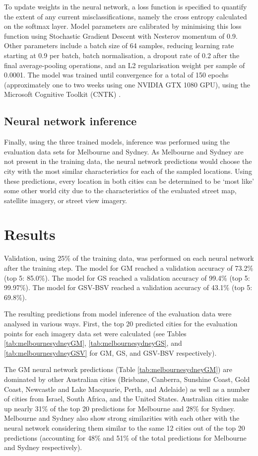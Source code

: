 \documentclass[10pt,letterpaper,hidelinks]{article}
\begin{document}
To update weights in the neural network, a loss function is specified to quantify the extent of any current misclassifications, namely the cross entropy calculated on the softmax layer. Model parameters are calibrated by minimising this loss function using Stochastic Gradient Descent with Nesterov momentum of 0.9. Other parameters include a batch size of 64 samples, reducing learning rate starting at 0.9 per batch, batch normalisation, a dropout rate of 0.2 after the final average-pooling operations, and an L2 regularisation weight per sample of 0.0001. 
The model was trained until convergence for a total of 150 epochs (approximately one to two weeks using one NVIDIA GTX 1080 GPU), using the Microsoft Cognitive Toolkit (CNTK) \cite{Yu2015}. 


\subsection*{Neural network inference}\label{sec:methods5}    
Finally, using the three trained models, inference was performed using the evaluation data sets for Melbourne and Sydney. As Melbourne and Sydney are not present in the training data, the neural network predictions would choose the city with the most similar characteristics for each of the sampled locations. Using these predictions, every location in both cities can be determined to be `most like' some other world city due to the characteristics of the evaluated street map, satellite imagery, or street view imagery.

\section*{Results}\label{sec:results}

Validation, using 25\% of the training data, was performed on each neural network after the training step. The model for GM reached a validation accuracy of 73.2\% (top 5: 85.0\%). The model for GS reached a validation accuracy of 99.4\% (top 5: 99.97\%). The model for GSV-BSV reached a validation accuracy of 43.1\% (top 5: 69.8\%).

The resulting predictions from model inference of the evaluation data were analysed in various ways. First, the top 20 predicted cities for the evaluation points for each imagery data set were calculated (see Tables \ref{tab:melbournesydneyGM}, \ref{tab:melbournesydneyGS}, and \ref{tab:melbournesydneyGSV} for GM, GS, and GSV-BSV respectively).

The GM neural network predictions (Table \ref{tab:melbournesydneyGM}) are dominated by other Australian cities (Brisbane, Canberra, Sunshine Coast, Gold Coast, Newcastle and Lake Macquarie, Perth, and Adelaide) as well as a number of cities from Israel, South Africa, and the United States. Australian cities make up nearly 31\% of the top 20 predictions for Melbourne and 28\% for Sydney. Melbourne and Sydney also show strong similarities with each other with the neural network considering them similar to the same 12 cities out of the top 20 predictions (accounting for 48\% and 51\% of the total predictions for Melbourne and Sydney respectively).
\end{document}
